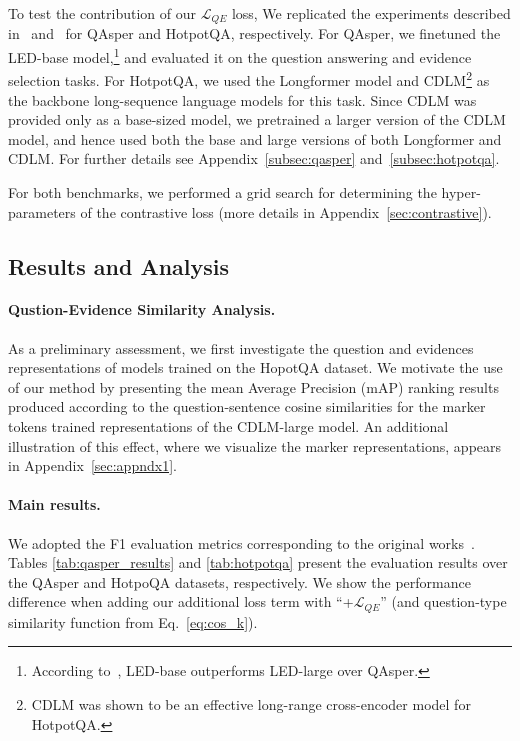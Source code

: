 To test the contribution of our $\mathcal{L}_{QE}$ loss, We replicated the experiments described in~\citet{dasigi-etal-2021-dataset} and~\citet{caciularu-etal-2021-cdlm-cross} for QAsper and HotpotQA, respectively. For QAsper, we finetuned the LED-base model,\footnote{According to~\citet{dasigi-etal-2021-dataset}, LED-base outperforms LED-large over QAsper.} and evaluated it on the question answering and evidence selection tasks. For HotpotQA, we used the Longformer model and CDLM\footnote{CDLM was shown to be an effective long-range cross-encoder model for HotpotQA.} as the backbone long-sequence language models for this task. Since CDLM was provided only as a base-sized model, we pretrained a larger version of the CDLM model, and hence used both the base and large versions of both Longformer and CDLM. For further details see Appendix~\ref{subsec:qasper} and~\ref{subsec:hotpotqa}.

For both benchmarks, we performed a grid search for determining the hyper-parameters of the contrastive loss (more details in Appendix~\ref{sec:contrastive}).
\subsection{Results and Analysis}
\paragraph{Qustion-Evidence Similarity Analysis.} As a preliminary assessment, we first investigate the question and evidences representations of models trained on the HopotQA dataset. We motivate the use of our method by presenting the mean Average Precision (mAP) ranking results produced according to the question-sentence cosine similarities for the marker tokens trained representations of the CDLM-large model.  An additional illustration of this effect, where we visualize the marker representations, appears in Appendix~\ref{sec:appndx1}.

\paragraph{Main results.} We adopted the F1 evaluation metrics corresponding to the original works~\cite{dasigi-etal-2021-dataset,longformer}. Tables \ref{tab:qasper_results} and \ref{tab:hotpotqa} present the evaluation results over the QAsper and HotpoQA datasets, respectively. We show the performance difference when adding our additional loss term with ``+$\mathcal{L}_{QE}$'' (and question-type similarity function from Eq.~\ref{eq:cos_k}). 

